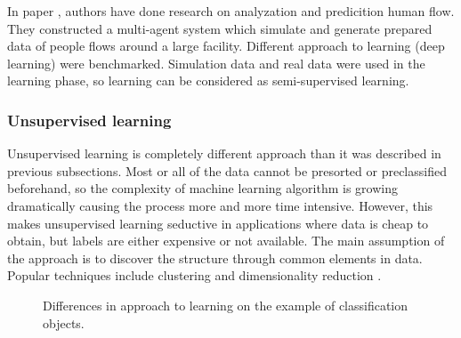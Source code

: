 In paper \cite{SSPredicition}, authors have done research on analyzation and predicition human flow. They constructed a multi-agent system which simulate and generate prepared data of people flows around a large facility. Different approach to learning (deep learning) were benchmarked. Simulation data and real data were used in the learning phase, so learning can be considered as semi-supervised learning. 

\subsubsection{Unsupervised learning}

Unsupervised learning is completely different approach than it was described in previous subsections. Most or all of the data cannot be presorted or preclassified beforehand, so the complexity of machine learning algorithm is growing dramatically causing the process more and more time intensive. 
However, this makes unsupervised learning seductive in applications where data is cheap to obtain, but labels are either expensive or not available. The main assumption of the approach is to discover the structure through common elements in data.
Popular techniques include clustering and dimensionality reduction
\cite{UnsupervisedLearning1, UnsupervisedLearning2}.

\begin{figure}[H]%
	\centering
	\qquad
	\caption{Differences in approach to learning on the example of classification objects.}%
	\label{fig:DifferencesLearning}%
\end{figure}

